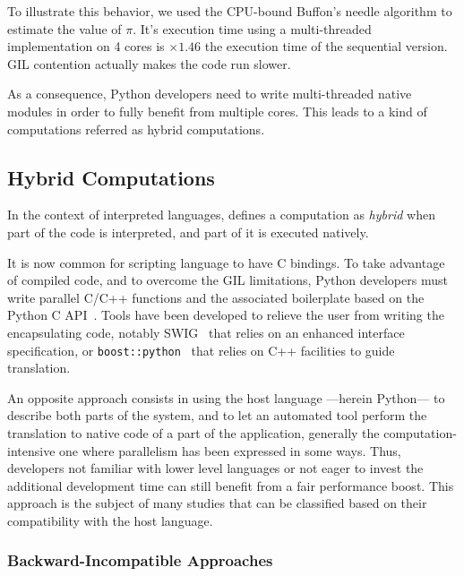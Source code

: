 \documentclass{llncs}
\begin{document}
To illustrate this behavior, we used the CPU-bound Buffon's needle algorithm to
estimate the value of $\pi$. It's execution time using a multi-threaded
implementation on 4 cores is $\times 1.46$ the execution time of the sequential
version. GIL contention actually makes the code run slower. 

As a consequence, Python developers need to write multi-threaded native
modules in order to fully benefit from multiple cores. This leads to a kind of
computations referred as hybrid computations.



\subsection{Hybrid Computations}

In the context of interpreted languages, \cite{dongara2007} defines a computation
as \emph{hybrid} when part of the code is interpreted, and part of it is
executed natively.

It is now common for scripting language to have C bindings. To take advantage of
compiled code, and to overcome the GIL limitations, Python developers must write
parallel C/C++ functions and the associated boilerplate based on the Python C
API~\cite{pythoncapi}. Tools have been developed to relieve the user from
writing the encapsulating code, notably SWIG~\cite{swig2003} that relies on an
enhanced interface specification, or
\texttt{boost::python}~\cite{boostpython2007} that relies on C++ facilities to
guide translation.

An opposite approach consists in using the host language ---herein Python---
to describe both parts of the system, and to let an automated tool perform the
translation to native code of a part of the application, generally the
computation-intensive one where parallelism has been expressed in some ways.
Thus, developers not familiar with lower level languages or not eager to invest
the additional development time can still benefit from a fair performance boost.
This approach is the subject of many studies that can be classified based on
their compatibility with the host language.

\subsubsection{Backward-Incompatible Approaches}
\end{document}

